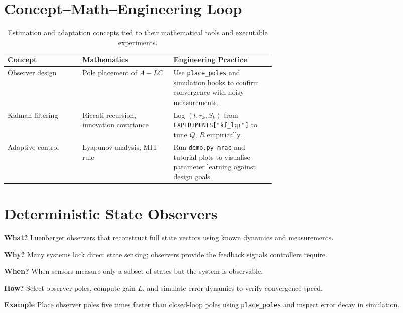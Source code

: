 \section{Concept--Math--Engineering Loop}
\begin{table}[h]
    \centering
    \small
    \renewcommand{\arraystretch}{1.2}
    \begin{tabularx}{\linewidth}{|>{\raggedright\arraybackslash}p{0.28\linewidth}|>{\raggedright\arraybackslash}p{0.34\linewidth}|>{\raggedright\arraybackslash}X|}
        \hline
        \textbf{Concept} & \textbf{Mathematics} & \textbf{Engineering Practice} \\
        \hline
        Observer design & Pole placement of $A - L C$ & Use \texttt{place\_poles} and simulation hooks to confirm convergence with noisy measurements. \\
        \hline
        Kalman filtering & Riccati recursion, innovation covariance & Log $(t, r_k, S_k)$ from \texttt{EXPERIMENTS["kf\_lqr"]} to tune $Q$, $R$ empirically. \\
        \hline
        Adaptive control & Lyapunov analysis, MIT rule & Run \texttt{demo.py mrac} and tutorial plots to visualise parameter learning against design goals. \\
        \hline
    \end{tabularx}
    \caption{Estimation and adaptation concepts tied to their mathematical tools and executable experiments.}
\end{table}

\section{Deterministic State Observers}
\begin{beginnerguide}
    \item[\textbf{What?}] Luenberger observers that reconstruct full state vectors using known dynamics and measurements.
    \item[\textbf{Why?}] Many systems lack direct state sensing; observers provide the feedback signals controllers require.
    \item[\textbf{When?}] When sensors measure only a subset of states but the system is observable.
    \item[\textbf{How?}] Select observer poles, compute gain $L$, and simulate error dynamics to verify convergence speed.
    \item[\textbf{Example}] Place observer poles five times faster than closed-loop poles using \texttt{place\_poles} and inspect error decay in simulation.
\end{beginnerguide}
